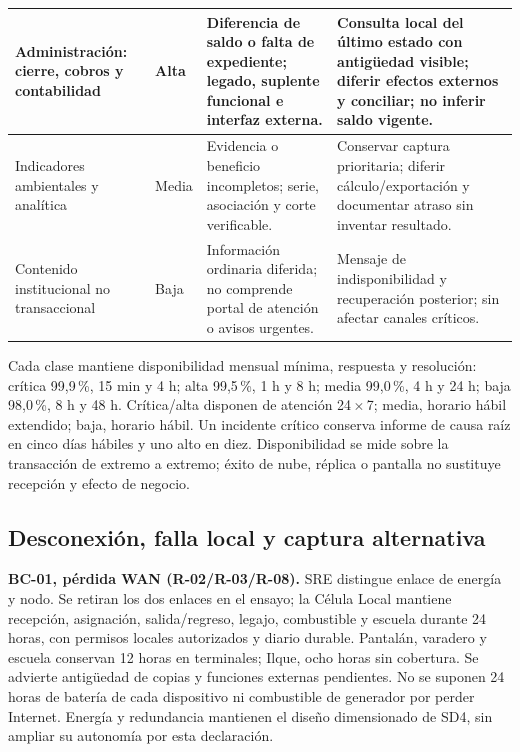 \begin{longtable}{L{.22\textwidth}L{.10\textwidth}L{.29\textwidth}L{.29\textwidth}}
Administración: cierre, cobros y contabilidad & Alta & Diferencia de saldo o falta de expediente; legado, suplente funcional e interfaz externa. & Consulta local del último estado con antigüedad visible; diferir efectos externos y conciliar; no inferir saldo vigente.\\\hline
Indicadores ambientales y analítica & Media & Evidencia o beneficio incompletos; serie, asociación y corte verificable. & Conservar captura prioritaria; diferir cálculo/exportación y documentar atraso sin inventar resultado.\\\hline
Contenido institucional no transaccional & Baja & Información ordinaria diferida; no comprende portal de atención o avisos urgentes. & Mensaje de indisponibilidad y recuperación posterior; sin afectar canales críticos.\\\hline
\end{longtable}\endgroup
{}
Cada clase mantiene disponibilidad mensual mínima, respuesta y resolución: crítica 99,9\,\%, 15 min y 4 h; alta 99,5\,\%, 1 h y 8 h; media 99,0\,\%, 4 h y 24 h; baja 98,0\,\%, 8 h y 48 h. Crítica/alta disponen de atención 24\,$\times$\,7; media, horario hábil extendido; baja, horario hábil. Un incidente crítico conserva informe de causa raíz en cinco días hábiles y uno alto en diez. Disponibilidad se mide sobre la transacción de extremo a extremo; éxito de nube, réplica o pantalla no sustituye recepción y efecto de negocio. \parencite[art.~78; p.~40]{sd8-ba}

\subsection{Desconexión, falla local y captura alternativa}\label{sec:sd8-bcp-local}
\textbf{BC-01, pérdida WAN (R-02/R-03/R-08).} SRE distingue enlace de energía y nodo. Se retiran los dos enlaces en el ensayo; la Célula Local mantiene recepción, asignación, salida/regreso, legajo, combustible y escuela durante 24 horas, con permisos locales autorizados y diario durable. Pantalán, varadero y escuela conservan 12 horas en terminales; Ilque, ocho horas sin cobertura. Se advierte antigüedad de copias y funciones externas pendientes. No se suponen 24 horas de batería de cada dispositivo ni combustible de generador por perder Internet. Energía y redundancia mantienen el diseño dimensionado de SD4, sin ampliar su autonomía por esta declaración.

